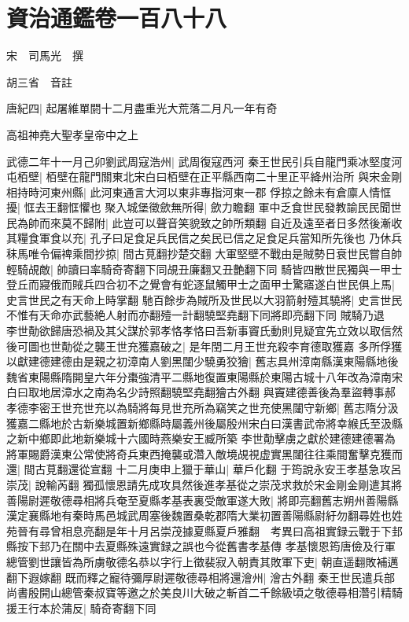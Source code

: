 \chapter{資治通鑑卷一百八十八}


宋　司馬光　撰

胡三省　音註

唐紀四|{
	起屠維單閼十二月盡重光大荒落二月凡一年有奇}


高祖神堯大聖孝皇帝中之上

武德二年十一月己卯劉武周寇浩州|{
	武周復寇西河}
秦王世民引兵自龍門乘冰堅度河屯栢壁|{
	栢壁在龍門關東北宋白曰栢壁在正平縣西南二十里正平絳州治所}
與宋金剛相持時河東州縣|{
	此河東通言大河以東非專指河東一郡}
俘掠之餘未有倉廪人情恇擾|{
	恇去王翻恇懼也}
聚入城堡徵歛無所得|{
	歛力瞻翻}
軍中乏食世民發教諭民民聞世民為帥而來莫不歸附|{
	此豈可以聲音笑貌致之帥所類翻}
自近及遠至者日多然後漸收其糧食軍食以充|{
	孔子曰足食足兵民信之矣民已信之足食足兵當知所先後也}
乃休兵秣馬唯令偏禆乘間抄掠|{
	間古莧翻抄楚交翻}
大軍堅壁不戰由是賊勢日衰世民嘗自帥輕騎覘敵|{
	帥讀曰率騎奇寄翻下同覘丑廉翻又丑艶翻下同}
騎皆四散世民獨與一甲士登丘而寢俄而賊兵四合初不之覺會有蛇逐鼠觸甲士之面甲士驚寤遂白世民俱上馬|{
	史言世民之有天命上時掌翻}
馳百餘步為賊所及世民以大羽箭射殪其驍將|{
	史言世民不惟有天命亦武藝絶人射而亦翻殪一計翻驍堅堯翻下同將即亮翻下同}
賊騎乃退　李世勣欲歸唐恐禍及其父謀於郭孝恪孝恪曰吾新事竇氏動則見疑宜先立效以取信然後可圖也世勣從之襲王世充獲嘉破之|{
	是年閏二月王世充殺李育德取獲嘉}
多所俘獲以獻建德建德由是親之初漳南人劉黑闥少驍勇狡獪|{
	舊志具州漳南縣漢東陽縣地後魏省東陽縣隋開皇六年分棗強清平二縣地復置東陽縣於東陽古城十八年改為漳南宋白曰取地居漳水之南為名少詩照翻驍堅堯翻獪古外翻}
與竇建德善後為羣盜轉事郝孝德李密王世充世充以為騎將每見世充所為竊笑之世充使黑闥守新鄉|{
	舊志隋分汲獲嘉二縣地於古新樂城置新鄉縣時屬義州後屬殷州宋白曰漢書武帝將幸緱氏至汲縣之新中鄉即此地新樂城十六國時燕樂安王臧所築}
李世勣擊虜之獻於建德建德署為將軍賜爵漢東公常使將奇兵東西掩襲或濳入敵境覘視虚實黑闥往往乘間奮擊克獲而還|{
	間古莧翻還從宣翻}
十二月庚申上獵于華山|{
	華戶化翻}
于筠說永安王孝基急攻呂崇茂|{
	說輸芮翻}
獨孤懷恩請先成攻具然後進孝基從之崇茂求救於宋金剛金剛遣其將善陽尉遲敬德尋相將兵奄至夏縣孝基表裏受敵軍遂大敗|{
	將即亮翻舊志朔州善陽縣漢定襄縣地有秦時馬邑城武周塞後魏置桑乾郡隋大業初置善陽縣尉紆勿翻尋姓也姓苑晉有尋曾相息亮翻是年十月呂崇茂據夏縣夏戶雅翻　考異曰高祖實録云戰于下邽縣按下邽乃在關中去夏縣殊遠實録之誤也今從舊書孝基傳}
孝基懷恩筠唐儉及行軍總管劉世讓皆為所虜敬德名恭以字行上徵裴寂入朝責其敗軍下吏|{
	朝直遥翻敗補邁翻下遐嫁翻}
既而釋之寵待彌厚尉遲敬德尋相將還澮州|{
	澮古外翻}
秦王世民遣兵部尚書殷開山總管秦叔寶等邀之於美良川大破之斬首二千餘級頃之敬德尋相濳引精騎援王行本於蒲反|{
	騎奇寄翻下同}
